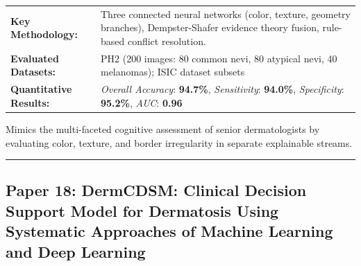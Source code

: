 \documentclass[10pt,a4paper]{article}
\begin{document}
\vspace{4pt}
\begin{tabularx}{\linewidth}{p{3.2cm}X}
\toprule
\textbf{Key Methodology:} & Three connected neural networks (color, texture, geometry branches), Dempster-Shafer evidence theory fusion, rule-based conflict resolution. \\
\textbf{Evaluated Datasets:} & PH2 (200 images: 80 common nevi, 80 atypical nevi, 40 melanomas); ISIC dataset subsets \\
\textbf{Quantitative Results:} & \textit{Overall Accuracy}: \textbf{94.7\%}, \textit{Sensitivity}: \textbf{94.0\%}, \textit{Specificity}: \textbf{95.2\%}, \textit{AUC}: \textbf{0.96} \\
\bottomrule
\end{tabularx}
\vspace{4pt}
\begin{tcolorbox}[utilitybox,title=Clinical Utility and Real-World Impact]
Mimics the multi-faceted cognitive assessment of senior dermatologists by evaluating color, texture, and border irregularity in separate explainable streams.
\end{tcolorbox}
\vspace{12pt}
\hrule
\vspace{12pt}
\subsection*{Paper 18: DermCDSM: Clinical Decision Support Model for Dermatosis Using Systematic Approaches of Machine Learning and Deep Learning}
\end{document}
